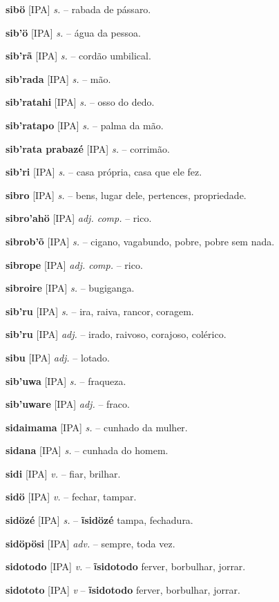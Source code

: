 \textbf{sibö} [IPA] \textit{s.} -- rabada de pássaro.

\textbf{sib'ö} [IPA] \textit{s.} -- água da pessoa.

\textbf{sib'rã} [IPA] \textit{s.} -- cordão umbilical.

\textbf{sib'rada} [IPA] \textit{s.} -- mão.

\textbf{sib'ratahi} [IPA] \textit{s.} -- osso do dedo.

\textbf{sib'ratapo} [IPA] \textit{s.} -- palma da mão.

\textbf{sib'rata prabazé} [IPA] \textit{s.} -- corrimão.

\textbf{sib'ri} [IPA] \textit{s.} -- casa própria, casa que ele fez.

\textbf{sibro} [IPA] \textit{s.} -- bens, lugar dele, pertences, propriedade.

\textbf{sibro'ahö} [IPA] \textit{adj. comp.} -- rico.

\textbf{sibrob'õ} [IPA] \textit{s.} -- cigano, vagabundo, pobre, pobre sem nada.

\textbf{sibrope} [IPA] \textit{adj. comp.} -- rico.

\textbf{sibroire} [IPA] \textit{s.} -- bugiganga.

\textbf{sib'ru} [IPA] \textit{s.} -- ira, raiva, rancor, coragem.

\textbf{sib'ru} [IPA] \textit{adj.} -- irado, raivoso, corajoso, colérico.

\textbf{sibu} [IPA] \textit{adj.} -- lotado.

\textbf{sib'uwa} [IPA] \textit{s.} -- fraqueza.

\textbf{sib'uware} [IPA] \textit{adj.} -- fraco.

\textbf{sidaimama} [IPA] \textit{s.} -- cunhado da mulher.

\textbf{sidana} [IPA] \textit{s.} -- cunhada do homem.

\textbf{sidi} [IPA] \textit{v.} -- fiar, brilhar.

\textbf{sidö} [IPA] \textit{v.} -- fechar, tampar.

\textbf{sidözé} [IPA] \textit{s.} -- \textbf{ĩsidözé} tampa, fechadura.

\textbf{sidöpösi} [IPA] \textit{adv.} -- sempre, toda vez.

\textbf{sidotodo} [IPA] \textit{v.} -- \textbf{ĩsidotodo} ferver, borbulhar, jorrar.

\textbf{sidototo} [IPA] \textit{v} -- \textbf{ĩsidotodo} ferver, borbulhar, jorrar.

